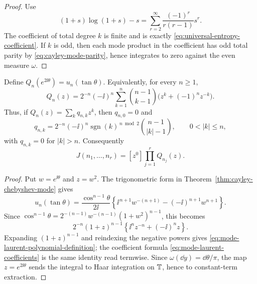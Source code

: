 \begin{proof}
Use
\[
(1+s)\log(1+s)-s=\sum_{r=2}^{\infty}\frac{(-1)^r}{r(r-1)}s^r.
\]
The coefficient of total degree \(k\) is finite and is exactly
\eqref{eq:universal-entropy-coefficient}.  If \(k\) is odd, then each mode
product in the coefficient has odd total parity by
\eqref{eq:cayley-mode-parity}, hence integrates to zero against the even
measure \(\omega\).
\end{proof}

\begin{theorem}%
\label{thm:finite-fourier-mode-integral-algorithm}
Define \(Q_n(e^{2\ii\theta})=u_n(\tan\theta)\).  Equivalently, for every
\(n\ge1\),
\begin{equation}\label{eq:mode-laurent-polynomial-definition}
Q_n(z)=2^{-n}(-\ii)^n
\sum_{k=1}^{n}\binom{n-1}{k-1}
\bigl(z^k+(-1)^nz^{-k}\bigr).
\end{equation}
Thus, if \(Q_n(z)=\sum_kq_{n,k}z^k\), then \(q_{n,0}=0\) and
\begin{equation}\label{eq:mode-laurent-coefficients}
q_{n,k}=
2^{-n}(-\ii)^n\operatorname{sgn}(k)^{\,n\bmod2}
\binom{n-1}{|k|-1},
\qquad 0<|k|\le n,
\end{equation}
with \(q_{n,k}=0\) for \(|k|>n\).
Consequently
\begin{equation}\label{eq:mode-integral-constant-term}
J(n_1,\ldots,n_r)=[z^0]\prod_{j=1}^r Q_{n_j}(z).
\end{equation}
\end{theorem}

\ifdefined\JFAArticleMain
{}
\else
\begin{proof}
Put \(w=e^{\ii\theta}\) and \(z=w^2\).  The trigonometric form in
Theorem~\ref{thm:cayley-chebyshev-mode} gives
\[
u_n(\tan\theta)
=\frac{\cos^{n-1}\theta}{2\ii}
\left\{\ii^{\,n+1}w^{-(n+1)}
-(-\ii)^{n+1}w^{n+1}\right\}.
\]
Since
\(\cos^{n-1}\theta=2^{-(n-1)}w^{-(n-1)}(1+w^2)^{n-1}\), this becomes
\[
2^{-n}(1+z)^{n-1}
\left\{\ii^nz^{-n}+(-\ii)^nz\right\}.
\]
Expanding \((1+z)^{n-1}\) and reindexing the negative powers gives
\eqref{eq:mode-laurent-polynomial-definition}; the coefficient formula
\eqref{eq:mode-laurent-coefficients} is the same identity read termwise.
Since \(\omega(\dd y)=\dd\theta/\pi\), the map \(z=e^{2\ii\theta}\) sends
the integral to Haar integration on \(\mathbb{T}\), hence to constant-term
extraction.
\end{proof}
\fi

